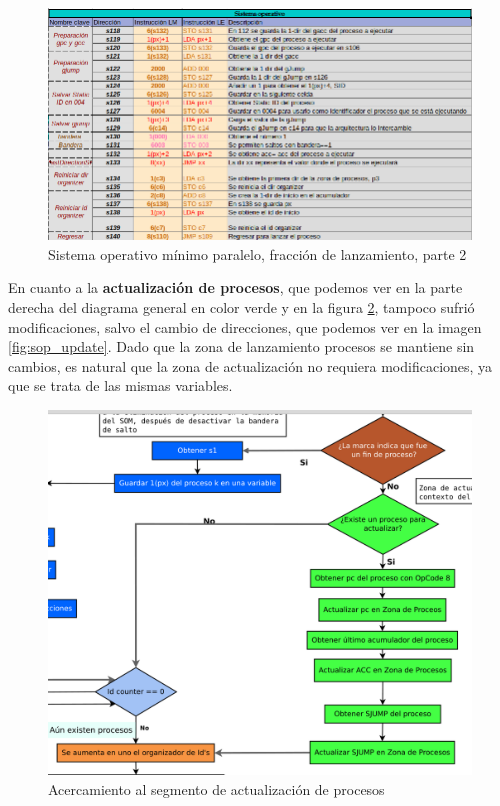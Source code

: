 \documentclass[letterpaper,12pt,oneside]{book}
\begin{document}
			
			\begin{figure}[h]		
				\centering
				\includegraphics[scale=0.5]{media/Paralela/sop_launch2.png}
				\caption{ Sistema operativo mínimo paralelo, fracción de lanzamiento, parte 2}
				\label{fig:sop_launch2}
			\end{figure}	


			En cuanto a la \textbf{actualización de procesos}, que podemos ver en la parte derecha del diagrama general en color verde
			y en la figura \ref{fig:diag_somp_update_process},
			tampoco sufrió modificaciones, salvo el cambio de direcciones, que podemos ver en la imagen \ref{fig:sop_update}. 
			Dado que la zona de lanzamiento procesos
			se mantiene sin cambios, es natural que la zona de actualización no requiera modificaciones, 
			ya que se trata de las mismas variables.


			\begin{figure}[h]		
				\centering
				\includegraphics[scale=0.4]{media/Paralela/diag_somp_update_process.png}
				\caption{Acercamiento al segmento de actualización de procesos}
				\label{fig:diag_somp_update_process}
			\end{figure}
\end{document}

